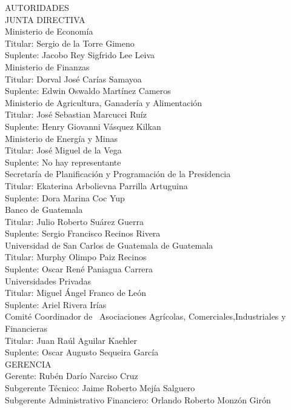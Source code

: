 \begin{center}
	{\Bold \LARGE AUTORIDADES}\\[1cm]
	
	
	{\Bold \large \color{color1!89!black} JUNTA  DIRECTIVA} \\[0.4cm]
	
	{ \Bold Ministerio de Economía}          \\
	Titular: Sergio de la Torre Gimeno   \\
	Suplente: Jacobo Rey Sigfrido Lee Leiva  \\ [0.4cm]
	
	{\Bold Ministerio de Finanzas} \\
	Titular: Dorval José Carías Samayoa \\
	Suplente: Edwin Oswaldo Martínez Cameros\\[0.4cm]
	
	{\Bold Ministerio de Agricultura, Ganadería y Alimentación} \\
	Titular: José Sebastian Marcucci Ruíz   \\
	Suplente: Henry Giovanni Vásquez Kilkan \\ [0.4cm]
	
	{\Bold Ministerio de Energía y Minas}\\
	Titular: José Miguel de la Vega \\
	Suplente: No hay representante\\ [0.4cm]
	{\Bold Secretaría de Planificación y Programación de la Presidencia}   \\
	Titular: Ekaterina Arbolievna Parrilla Artuguina   \\
	Suplente: Dora Marina Coc Yup\\ [0.4cm]
	{\Bold Banco de Guatemala} \\
	Titular: Julio Roberto Suárez Guerra \\
	Suplente: Sergio Francisco Recinos Rivera\\ [0.4cm]
	{\Bold Universidad de San Carlos de Guatemala de Guatemala} \\
	Titular: Murphy Olimpo Paiz Recinos   \\
	Suplente: Oscar René Paniagua Carrera  \\ [0.4cm]
	{\Bold Universidades Privadas} \\
	Titular: Miguel Ángel Franco de León \\             Suplente: Ariel Rivera Irías\\ [0.4cm]
	{\Bold Comité Coordinador de \ Asociaciones  Agrícolas, Comerciales,Industriales y Financieras} \\
	Titular: Juan Raúl Aguilar Kaehler \\
	Suplente:  Oscar Augusto Sequeira García  \\ [0.4cm]
	
	{\Bold \large \color{color1!89!black} GERENCIA}\\[0.2cm]
	Gerente:  Rubén Darío Narciso Cruz        \\
	Subgerente Técnico:  Jaime Roberto Mejía Salguero\\
	Subgerente Administrativo Financiero:  Orlando Roberto Monzón Girón\\
\end{center}
\clearpage


